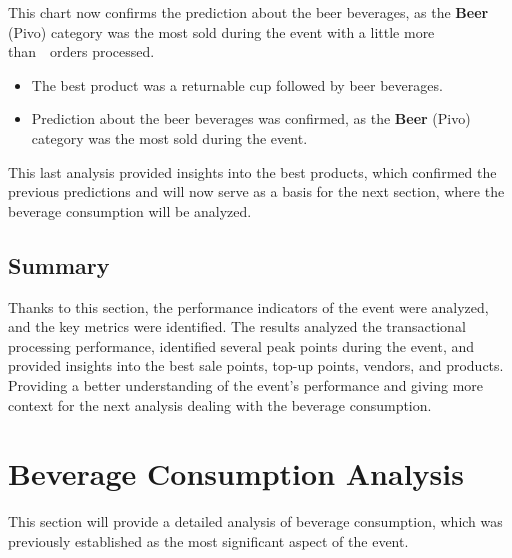 This chart now confirms the prediction about the beer beverages, as the \textbf{Beer} (Pivo) category was the most sold during the event with a little more than~~orders processed.

\begin{keytakeaways}
	\begin{itemize}
		\item The best product was a returnable cup followed by beer beverages.
		\item Prediction about the beer beverages was confirmed, as the \textbf{Beer} (Pivo) category was the most sold during the event.
	\end{itemize}
\end{keytakeaways}

This last analysis provided insights into the best products, which confirmed the previous predictions and will now serve as a basis for the next section, where the beverage consumption will be analyzed.


\subsection{Summary}
\label{subsec:analysis-performance-indicators-summary}

Thanks to this section, the performance indicators of the event were analyzed, and the key metrics were identified.
The results analyzed the transactional processing performance, identified several peak points during the event, and provided insights into the best sale points, top-up points, vendors, and products.
Providing a better understanding of the event's performance and giving more context for the next analysis dealing with the beverage consumption.



\section{Beverage Consumption Analysis}
\label{sec:analysis-beverage-consumption}

This section will provide a detailed analysis of beverage consumption, which was previously established as the most significant aspect of the event.

